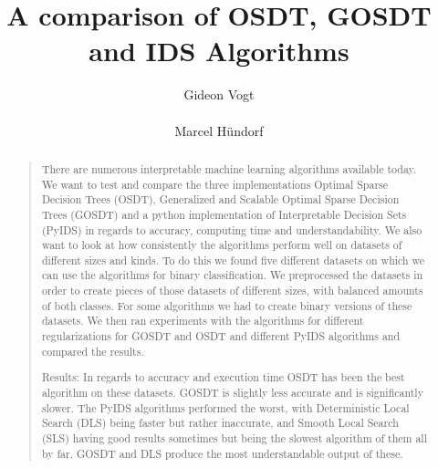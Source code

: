 \documentclass[a4paper,preprint]{sig-alternate-xt}
\begin{document}
\title{A comparison of OSDT, GOSDT and IDS Algorithms}


%
\author{
%
\alignauthor Gideon Vogt\\
       
\alignauthor Marcel Hündorf\\
}




\maketitle

\begin{abstract}
\begin{quote}
There are numerous interpretable machine learning algorithms available today. We want to test and compare the three implementations Optimal
Sparse Decision Trees (OSDT), Generalized and
Scalable Optimal Sparse Decision Trees (GOSDT) and a python implementation of Interpretable Decision Sets (PyIDS) in regards to accuracy, computing time and understandability. We also want to look at how consistently the algorithms perform well on datasets of different sizes and kinds. To do this we found five different datasets on which we can use the algorithms for binary classification. We preprocessed the datasets in order to create pieces of those datasets of different sizes, with balanced amounts of both classes. For some algorithms we had to create binary versions of these datasets. We then ran experiments with the algorithms for different regularizations for GOSDT and OSDT and different PyIDS algorithms and compared the results.

Results: In regards to accuracy and execution time OSDT has been the best algorithm on these datasets. GOSDT is slightly less accurate and is significantly slower. The PyIDS algorithms performed the worst, with Deterministic Local Search (DLS) being faster but rather inaccurate, and Smooth Local Search (SLS) having good results sometimes but being the slowest algorithm of them all by far. GOSDT and DLS produce the most understandable output of these. 
\end{quote}
\end{abstract}

\end{document}
